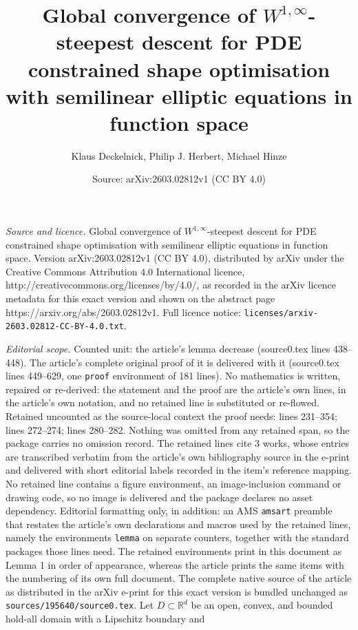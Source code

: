 \documentclass[10pt,a4paper]{amsart}
\title{Global convergence of $W^{1,\infty}$-steepest descent for PDE constrained shape optimisation with semilinear elliptic equations in function space}
\author{Klaus Deckelnick, Philip J. Herbert, Michael Hinze}
\date{Source: arXiv:2603.02812v1 (CC BY 4.0)}
\begin{document}
\maketitle

\noindent\emph{Source and licence.} Global convergence of $W^{1,\infty}$-steepest descent for PDE constrained shape optimisation with semilinear elliptic equations in function space. Version arXiv:2603.02812v1 (CC BY 4.0), distributed by arXiv under the Creative Commons Attribution 4.0 International licence, http://creativecommons.org/licenses/by/4.0/, as recorded in the arXiv licence metadata for this exact version and shown on the abstract page https://arxiv.org/abs/2603.02812v1. Full licence notice: \texttt{licenses/arxiv-2603.02812-CC-BY-4.0.txt}.\par\smallskip

\noindent\textit{Editorial scope.} Counted unit: the article's lemma decrease (source0.tex lines 438--448). The article's complete original proof of it is delivered with it (source0.tex lines 449--629, one \texttt{proof} environment of 181 lines). No mathematics is written, repaired or re-derived: the statement and the proof are the article's own lines, in the article's own notation, and no retained line is substituted or re-flowed.  Retained uncounted as the source-local context the proof needs: lines 231--354; lines 272--274; lines 280--282.  Nothing was omitted from any retained span, so the package carries no omission record.  The retained lines cite 3 works, whose entries are transcribed verbatim from the article's own bibliography source in the e-print and delivered with short editorial labels recorded in the item's reference mapping.  No retained line contains a figure environment, an image-inclusion command or drawing code, so no image is delivered and the package declares no asset dependency.  Editorial formatting only, in addition: an AMS \texttt{amsart} preamble that restates the article's own declarations and macros used by the retained lines, namely the environments \texttt{lemma} on separate counters, together with the standard packages those lines need.  The retained environments print in this document as Lemma 1 in order of appearance, whereas the article prints the same items with the numbering of its own full document.  The complete native source of the article as distributed in the arXiv e-print for this exact version is bundled unchanged as \texttt{sources/195640/source0.tex}.
\noindent
Let $D \subset \mathbb R^d$ be an open, convex, and bounded hold-all domain with a Lipschitz boundary and 
\end{document}
